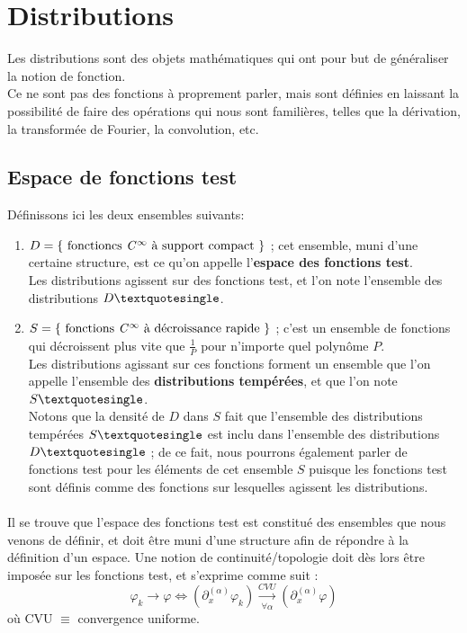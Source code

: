 \documentclass[../notesdecours.tex]{subfiles}
\begin{document}
\section{Distributions}
Les distributions sont des objets mathématiques qui ont pour but de généraliser la notion de fonction. \\
Ce ne sont pas des fonctions à proprement parler, mais sont définies en laissant la possibilité de faire des opérations
qui nous sont familières, telles que la dérivation, la transformée de Fourier, la convolution, etc.\\

\subsection{Espace de fonctions test}

Définissons ici les deux ensembles suivants: 
\begin{enumerate}
    \item $D = \left\{ \mbox{ fonctioncs \textit{C}$^{\infty}$ à support compact } \right\}$ ; cet ensemble, muni d'une certaine structure, est ce qu'on appelle l'\textbf{espace des fonctions test}.\\ 
    Les distributions agissent sur des fonctions test, et l'on note l'ensemble des distributions $D \textquotesingle$. \\
    \item $S = \left\{ \mbox{ fonctions \textit{C}$^{\infty}$ à décroissance rapide } \right\}$ ; c'est un ensemble de fonctions qui décroissent plus vite que $\frac{1}{P}$ pour n'importe quel polynôme $P$. \\
    Les distributions agissant sur ces fonctions forment un ensemble que l'on appelle l'ensemble des \textbf{distributions tempérées}, et que l'on note $S \textquotesingle$. \\
    Notons que la densité de $D$ dans $S$ fait que l'ensemble des distributions tempérées $S \textquotesingle$ est inclu dans l'ensemble des distributions $D \textquotesingle$ ;
    de ce fait, nous pourrons également parler de fonctions test pour les éléments de cet ensemble $S$ puisque les fonctions test sont définis comme des fonctions sur lesquelles agissent les distributions. 
\end{enumerate}

\paragraph{} Il se trouve que l'espace des fonctions test est constitué des ensembles que nous venons de définir, 
et doit être muni d'une structure afin de répondre à la définition d'un espace. 
Une notion de continuité/topologie doit dès lors être imposée sur les fonctions test, et s'exprime comme suit :
\begin{equation}
\varphi_k \rightarrow \varphi \iff (\partial_x^{(\alpha)} \varphi_k) \xrightarrow[\forall \alpha]{CVU} (\partial_x^{(\alpha)}\varphi)
\end{equation}
où CVU $\equiv$ convergence uniforme.
\end{document}
